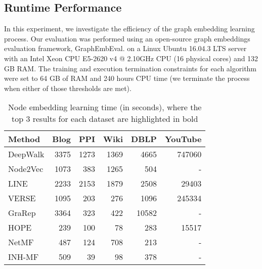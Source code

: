 \documentclass[conference]{IEEEtran}
\begin{document}
\subsection{Runtime Performance}

In this experiment, we investigate the efficiency of the graph embedding learning process. Our evaluation was performed using an open-source graph embeddings evaluation framework, GraphEmbEval. on a Linux Ubuntu 16.04.3 LTS server with an Intel Xeon CPU E5-2620 v4 @ 2.10GHz CPU (16 physical cores) and 132 GB RAM. The training and execution termination constraints for each algorithm were set to 64 GB of RAM and 240 hours CPU time (we terminate the process when either of those thresholds are met).

\begin{table}[htbp]\small \vspace{-4pt}
\caption{Node embedding learning time (in seconds), where the top 3 results for each dataset are highlighted in bold
}
\label{res_runtime_embs}
{
\vspace{-4pt}
\begin{tabular}{l|rrrrr}\hline
\textbf{Method}           & \textbf{Blog} & \textbf{PPI}  & \textbf{Wiki} & \textbf{DBLP}  & \textbf{YouTube} \\ \hline DeepWalk          & 3375 & 1273 & 1369 & 4665  & 747060                                                        \\
Node2Vec          & 1073 & 383  & 1265 & 504   & -                                                             \\
LINE              & 2233 & 2153 & 1879 & 2508  & 29403                                                       \\
VERSE             & 1095 & 203  & 276  & 1096  & 245334                                                       \\ \hline  GraRep            & 3364 & 323  & 422  & 10582 & -                                                            \\
HOPE              & 239  & 100  & 78   & 283   & 15517                                                        \\
NetMF             & 487  & 124  & 708  & 213   & -                                                         \\   \hline  INH-MF            & 509  & 39   & 98   & 378   & -                                                              \\ 

\end{tabular}}
\end{table}
\end{document}
